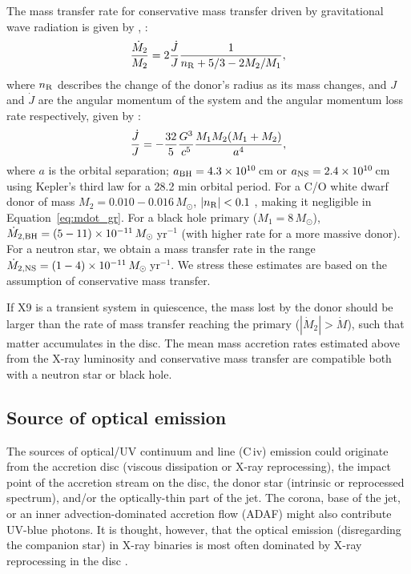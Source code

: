 \documentclass[a4paper,fleqn,usenatbib]{mnras}
\begin{document}
The mass transfer rate for conservative mass transfer driven by gravitational wave radiation is given by \citet{1975ctf..book.....L}, \citet{1993ARA&A..31...93V}:
\begin{equation}
\label{eq:mdot_gr}
\frac{\dot{M}_2}{M_2} = 2 \frac{\dot{J}}{J} \frac{1}{n_{\rm R} + 5/3 - 2M_2/M_1},
\end{equation}
where $n_{\rm R}$ describes the change of the donor's radius as its mass changes, and $J$ and $\dot{J}$ are the angular momentum of the system and the angular momentum loss rate respectively, given by \citet{1964PhRv..136.1224P}:
\begin{equation}
\label{eq:jdot_gr}
\frac{\dot{J}}{J} = -\frac{32}{5} \frac{G^3}{c^5} \frac{M_{\rm 1}M_{\rm 2}(M_{\rm 1} + M_{\rm 2})}{a^4},
\end{equation}
where $a$ is the orbital separation; $a_{\rm BH} = 4.3 \times 10^{10}$\,cm or $a_{\rm NS} = 2.4 \times 10^{10}$\,cm using Kepler's third law for a 28.2 min orbital period. For a C/O white dwarf donor of mass $M_2 = 0.010 - 0.016\,M_\odot$, $|n_{\rm R}| < 0.1$ \citep{2003ApJ...598.1217D}, making it negligible in Equation~\ref{eq:mdot_gr}. For a black hole primary ($M_1 = 8\,M_\odot$), $\dot{M}_{2, {\rm BH}} = (5-11) \times 10^{-11}\,M_\odot$\,yr$^{-1}$ (with higher rate for a more massive donor). For a neutron star, we obtain a mass transfer rate in the range $\dot{M}_{2, {\rm NS}} = (1-4) \times 10^{-11}\,M_\odot$\,yr$^{-1}$. We stress these estimates are based on the assumption of conservative mass transfer.

If X9 is a transient system in quiescence, the mass lost by the donor should be larger than the rate of mass transfer reaching the primary ($|\dot{M}_2| > \dot{M}$), such that matter accumulates in the disc. The mean mass accretion rates estimated above from the X-ray luminosity and conservative mass transfer are compatible both with a neutron star or black hole.

\subsection{Source of optical emission}
\label{sec:source_emission}

The sources of optical/UV continuum and line (C\,{\sc iv}) emission could originate from the accretion disc (viscous dissipation or X-ray reprocessing), the impact point of the accretion stream on the disc, the donor star (intrinsic or reprocessed spectrum), and/or the optically-thin part of the jet. The corona, base of the jet, or an inner advection-dominated accretion flow (ADAF) might also contribute UV-blue photons. It is thought, however, that the optical emission (disregarding the companion star) in X-ray binaries is most often dominated by X-ray reprocessing in the disc \citep{1990A&A...235..162V, 2006MNRAS.371.1334R, 2016ApJ...826..149B}.
\end{document}

